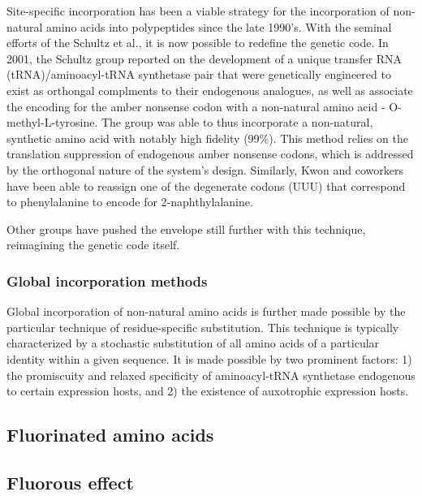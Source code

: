 \begin{refsection}
Site-specific incorporation has been a viable strategy for the incorporation of
non-natural amino acids into polypeptides since the late 1990's. With the
seminal efforts of the Schultz et al., it is now possible to redefine the
genetic code. In 2001, the Schultz group reported on the development of a unique
transfer RNA (tRNA)/aminoacyl-tRNA synthetase pair that were genetically
engineered to exist as orthongal complments to their endogenous analogues, as
well as associate the encoding for the amber nonsense codon with a non-natural
amino acid - O-methyl-L-tyrosine. The group was able to thus incorporate a
non-natural, synthetic amino acid with notably high fidelity
(99\%).\cite{Wang2001} This method relies on the translation suppression of
endogenous amber nonsense codons, which is addressed by the orthogonal nature of
the system's design. Similarly, Kwon and coworkers have been able to reassign
one of the degenerate codons (UUU) that correspond to phenylalanine to encode
for 2-naphthylalanine.\cite{Kwon2003}

Other groups have pushed the envelope still further with this technique,
reimagining the genetic code itself.

\subsubsection{Global incorporation methods} 


Global incorporation of non-natural amino acids is further made possible by the
particular technique of residue-specific substitution. This technique is
typically characterized by a stochastic substitution of all amino acids of a
particular identity within a given sequence. It is made possible by two
prominent factors: 1) the promiscuity and relaxed specificity of aminoacyl-tRNA
synthetase endogenous to certain expression hosts, and 2) the existence of
auxotrophic expression hosts.

\subsection{Fluorinated amino acids}



\subsection{Fluorous effect}


\end{refsection}
